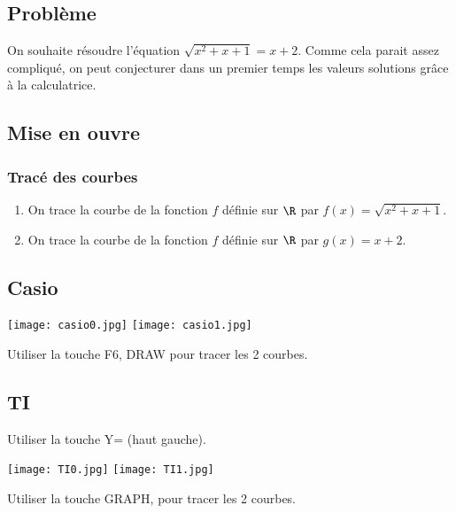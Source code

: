 \begin{titreTice}

\end{titreTice}

\subsection*{Problème}

On souhaite résoudre l'équation $\sqrt{x^2+x+1}=x+2$.
Comme cela parait assez compliqué, on peut conjecturer dans un premier temps les valeurs solutions grâce à la calculatrice.

\subsection*{Mise en ouvre }

\subsubsection*{Tracé des courbes}

\begin{enumerate}
\item On trace la courbe de la fonction $f$ définie sur $\R$ par $f(x)=\sqrt{x^2+x+1}$.
\item On trace la courbe de la fonction $f$ définie sur $\R$ par $g(x)=x+2$.
\end{enumerate}

\begin{minipage}{7.5cm}

\subsection*{Casio}
\texttt{[image: casio0.jpg]} 
\vspace{0.3cm}
\texttt{[image: casio1.jpg]}

 
Utiliser la touche F6, DRAW pour tracer les 2 courbes.

\end{minipage}\hspace{1cm}
\begin{minipage}{7.5cm}

\subsection*{TI}
Utiliser la touche Y= (haut gauche).

\texttt{[image: TI0.jpg]} 
\vspace{0.3cm}
\texttt{[image: TI1.jpg]}
 
Utiliser la touche GRAPH, pour tracer les 2 courbes.
\end{minipage}



